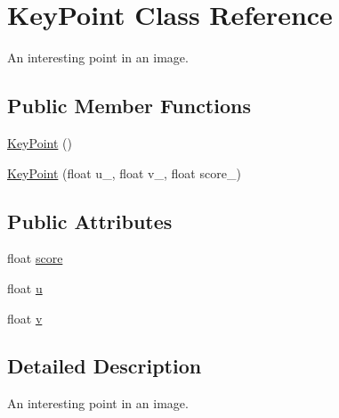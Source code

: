 \hypertarget{classfovis_1_1KeyPoint}{
\section{KeyPoint Class Reference}
\label{classfovis_1_1KeyPoint}
}


An interesting point in an image.  


\subsection*{Public Member Functions}
\begin{DoxyCompactItemize}
\item 
\hyperlink{classfovis_1_1KeyPoint_a5c7501367f6f5207d0bf90916a8807f5}{KeyPoint} ()
\item 
\hyperlink{classfovis_1_1KeyPoint_a433f4b9f56afe421648c0bd16361a416}{KeyPoint} (float u\_\-, float v\_\-, float score\_\-)
\end{DoxyCompactItemize}
\subsection*{Public Attributes}
\begin{DoxyCompactItemize}
\item 
float \hyperlink{classfovis_1_1KeyPoint_a8c5cd9b525ee73a24b1d9d8e34982d1c}{score}
\item 
float \hyperlink{classfovis_1_1KeyPoint_a55831f7eab5ed2917a0191e858852f42}{u}
\item 
float \hyperlink{classfovis_1_1KeyPoint_a48d9522e58fa05906c6dba23e5745a72}{v}
\end{DoxyCompactItemize}


\subsection{Detailed Description}
An interesting point in an image. 

